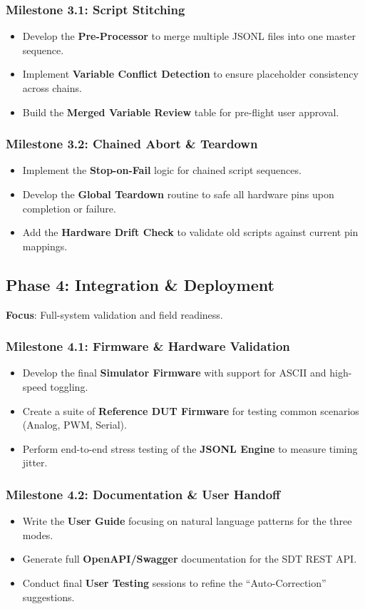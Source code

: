 \documentclass[conference]{IEEEtran}
\begin{document}
\subsubsection{Milestone 3.1: Script Stitching}
\begin{itemize}
    \item Develop the \textbf{Pre-Processor} to merge multiple JSONL files into one master sequence.
    \item Implement \textbf{Variable Conflict Detection} to ensure placeholder consistency across chains.
    \item Build the \textbf{Merged Variable Review} table for pre-flight user approval.
\end{itemize}
\subsubsection{Milestone 3.2: Chained Abort \& Teardown}
\begin{itemize}
    \item Implement the \textbf{Stop-on-Fail} logic for chained script sequences.
    \item Develop the \textbf{Global Teardown} routine to safe all hardware pins upon completion or failure.
    \item Add the \textbf{Hardware Drift Check} to validate old scripts against current pin mappings.
\end{itemize}

\subsection{Phase 4: Integration \& Deployment}
\textbf{Focus}: Full-system validation and field readiness.
\subsubsection{Milestone 4.1: Firmware \& Hardware Validation}
\begin{itemize}
    \item Develop the final \textbf{Simulator Firmware} with support for ASCII and high-speed toggling.
    \item Create a suite of \textbf{Reference DUT Firmware} for testing common scenarios (Analog, PWM, Serial).
    \item Perform end-to-end stress testing of the \textbf{JSONL Engine} to measure timing jitter.
\end{itemize}
\subsubsection{Milestone 4.2: Documentation \& User Handoff}
\begin{itemize}
    \item Write the \textbf{User Guide} focusing on natural language patterns for the three modes.
    \item Generate full \textbf{OpenAPI/Swagger} documentation for the SDT REST API.
    \item Conduct final \textbf{User Testing} sessions to refine the ``Auto-Correction'' suggestions.
\end{itemize}
\end{document}
